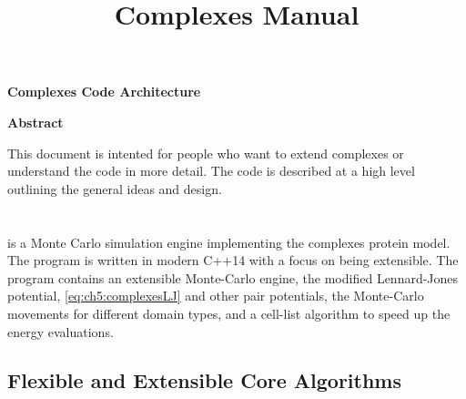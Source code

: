 \documentclass[12pt, twoside]{report}
\begin{document}
\title{Complexes Manual}

\thispagestyle{plain}
\begin{center}
    \Large
    \textbf{Complexes Code Architecture}
       
    \vspace{0.9cm}
    \textbf{Abstract}
\end{center}

This document is intented for people who want to extend complexes or understand the 
code in more detail. The code is described at a high level outlining the general
ideas and design.

\tableofcontents

\chapter{\complexes}

\complexes is a Monte Carlo simulation engine implementing the complexes protein
model. The program is written in modern \mbox{C++14} with a focus on being
extensible. The program contains an extensible Monte-Carlo engine, the modified
Lennard-Jones potential, \cref{eq:ch5:complexesLJ} and other pair potentials,
the Monte-Carlo movements for different domain types, and a cell-list algorithm
\cite{frenkel2001understanding} to speed up the energy evaluations.


\section{Flexible and Extensible Core Algorithms}
\end{document}
